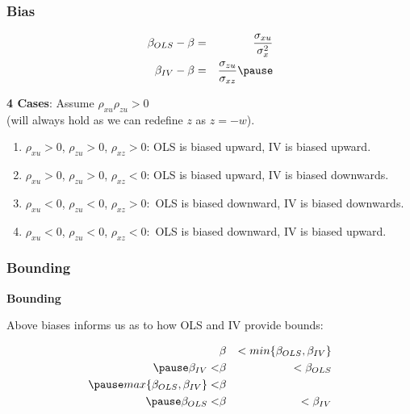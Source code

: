 \documentclass{beamer}
\begin{document}
\begin{frame}
\frametitle{Bias}

\begin{eqnarray*}
\beta_{OLS}-\beta&=&\frac{\sigma_{xu}}{\sigma_x^2} \\
\beta_{IV}-\beta&=&\frac{\sigma_{zu}}{\sigma_{xz}} \pause
\end{eqnarray*}

\textbf{4 Cases}: \pause Assume $\rho_{xu}\rho_{zu}>0$ \\ \pause (will always hold as we can redefine $z$ as $z=-w$). \pause


\begin{enumerate}
  \item $\rho_{xu}>0$, $\rho_{zu}>0$, $\rho_{xz}>0$: \pause OLS is biased upward, IV is biased upward.  \pause
  \item $\rho_{xu}>0$, $\rho_{zu}>0$, $\rho_{xz}<0$: \pause OLS is biased upward, IV is biased downwards.  \pause
  \item $\rho_{xu}<0$, $\rho_{zu}<0$, $\rho_{xz}>0:$ \pause OLS is biased downward, IV is biased downwards.  \pause
  \item $\rho_{xu}<0$, $\rho_{zu}<0$, $\rho_{xz}<0:$ \pause OLS is biased downward, IV is biased upward.
\end{enumerate}

\end{frame}

\begin{frame}
\frametitle{Bounding}
\textbf{Bounding} \\ \medskip \pause

Above biases informs us as to how OLS and IV provide bounds: \\ \pause

\begin{eqnarray}
  &\beta&<min\{\beta_{OLS},\beta_{IV}\} \\ \pause 
  \beta_{IV}<&\beta&<\beta_{OLS}  \\ \pause 
  max\{\beta_{OLS},\beta_{IV}\}<&\beta& \\ \pause
  \beta_{OLS}<&\beta&<\beta_{IV}
\end{eqnarray}

\end{frame}

\end{document}

